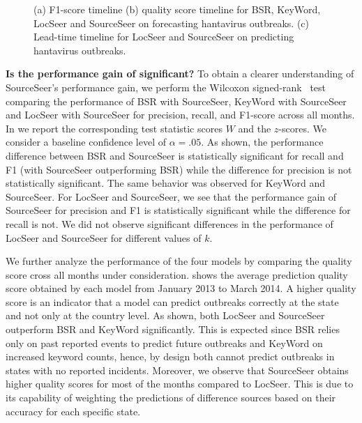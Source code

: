 \documentclass[twoside,leqno,twocolumn]{article}
\newcommand{\fullmodel}{{{\sf SourceSeer}}\xspace}
\newcommand{\locationmodel}{{\sf LocSeer}\xspace}
\newcommand{\keymodel}{{\sf KeyWord}\xspace}
\begin{document}
\begin{figure}[t]
\begin{center}
\end{center}
\vspace{-20pt}
\caption{(a) F1-score timeline (b) quality score timeline for BSR, \keymodel, \locationmodel and \fullmodel on forecasting hantavirus outbreaks. (c) Lead-time timeline for \locationmodel and \fullmodel on predicting hantavirus outbreaks.}
\vspace{-15pt}
\label{fig:perf_timelines}
\end{figure}


\vspace{2pt}\noindent\textbf{Is the performance gain of {} significant?} To obtain a clearer understanding of \fullmodel's performance gain, we perform the Wilcoxon signed-rank~\cite{Wilcoxon45} test comparing the performance of  BSR with \fullmodel,  \keymodel with \fullmodel and \locationmodel with \fullmodel for precision, recall, and F1-score across all months. In  we report the corresponding test statistic scores $W$ and the $z$-scores. We consider a baseline confidence level of $\alpha = .05$. As shown, the performance difference between BSR and \fullmodel is statistically significant for recall and F1 (with \fullmodel outperforming BSR) while the difference for precision is not statistically significant. The same behavior was observed for \keymodel and \fullmodel. For \locationmodel and \fullmodel, we see that the performance gain of \fullmodel for precision and F1 is statistically significant while the difference for recall is not. We did not observe significant differences in the performance of \locationmodel and \fullmodel for different values of $k$. 

We further analyze the performance of the four models by comparing the quality score cross all months under consideration.  shows the average prediction quality score obtained by each model from January 2013 to March 2014. A higher quality score is an indicator that a model can predict outbreaks correctly at the state and not only at the country level. As shown, both \locationmodel and \fullmodel outperform BSR and \keymodel significantly. This is expected since BSR relies only on past reported events to predict future outbreaks and \keymodel on increased keyword counts, hence, by design both cannot predict outbreaks in states with no reported incidents. Moreover, we observe that \fullmodel obtains higher quality scores for most of the months compared to \locationmodel. This is due to its capability of weighting the predictions of difference sources  based on their accuracy for each specific state.
\end{document}
